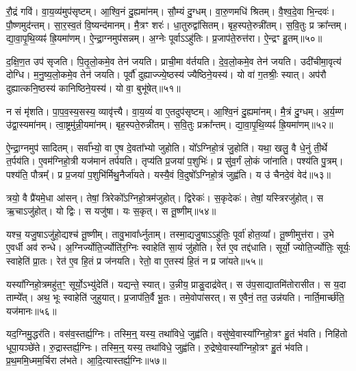 रौ॒द्रं गवि॑।
वा॒य॒व्य॑मुप॑सृष्टम्।
आ॒श्वि॒नं दु॒ह्यमा॑नम्।
सौ॒म्यं दु॒ग्धम्।
वा॒रु॒णमधि॑ श्रितम्।
वै॒श्व॒दे॒वा भि॒न्दवः॑।
पौ॒ष्णमुद॑न्तम्।
सा॒र॒स्व॒तं वि॒ष्यन्द॑मानम्।
मै॒त्रꣳ शरः॑।
धा॒तुरुद्वा॑सितम्।
बृह॒स्पते॒रुन्नी॑तम्।
स॒वि॒तुः प्र क्रा᳚न्तम्।
द्या॒वा॒पृ॒थि॒व्यꣴ॑ ह्रि॒यमा॑णम्।
ऐ॒न्द्रा॒ग्नमुप॑सन्नम्।
अ॒ग्नेः पूर्वा\-ऽऽहु॑तिः।
प्र॒जा\-प॑ते॒रुत्त॑रा।
ऐ॒न्द्रꣳ हु॒तम्॥५०॥\anuvakamend[उद्वा॑सितꣳ स॒प्त च॑]

द॒क्षि॒ण॒त उप॑ \-सृजति।
पि॒तृ॒लो॒कमे॒व तेन॑ जयति।
प्राची॒मा व॑र्तयति।
दे॒व॒लो॒कमे॒व तेन॑ जयति।
उदी॑चीमा॒वृत्य॑ दोग्धि।
म॒नु॒ष्य॒लो॒कमे॒व तेन॑ जयति।
पूर्वौ॑ दुह्याज्ज्ये॒ष्ठस्य॑ ज्यैष्ठिने॒यस्य॑।
यो वा॑ ग॒तश्रीः॒ स्यात्।
अप॑रौ दुह्यात्कनि॒ष्ठस्य॑ कानिष्ठिने॒यस्य॑।
यो वा॒ बुभू॑षेत्॥५१॥

न सं मृ॑शति।
पा॒प॒व॒स्य॒सस्य॒ व्यावृ॑त्त्यै।
वा॒य॒व्यं॑ वा ए॒तदुप॑सृष्टम्।
आ॒श्वि॒नं दु॒ह्यमा॑नम्।
मै॒त्रं दु॒ग्धम्।
अ॒र्य॒म्ण उ॑द्वा॒स्यमा॑नम्।
त्वा॒ष्ट्रमु॑न्नी॒यमा॑नम्।
बृह॒स्पते॒रुन्नी॑तम्।
स॒वि॒तुः प्रक्रा᳚न्तम्।
द्या॒वा॒पृ॒थि॒व्यꣴ॑ ह्रि॒यमा॑णम्॥५२॥

ऐ॒न्द्रा॒ग्नमुप॑ सादितम्।
सर्वा᳚भ्यो॒ वा ए॒ष दे॒वता᳚भ्यो जुहोति।
यो᳚ऽग्निहो॒त्रं जु॒होति॑।
यथा॒ खलु॒ वै धे॒नुं ती॒र्थे त॒र्पय॑ति।
ए॒वम॑ग्निहो॒त्री यज॑मानं तर्पयति।
तृप्य॑ति प्र॒जया॑ प॒शुभिः॑।
प्र सु॑व॒र्गं लो॒कं जा॑नाति।
पश्य॑ति पु॒त्रम्।
पश्य॑ति॒ पौत्रम्᳚।
प्र प्र॒जया॑ प॒शुभि॑र्मिथु॒नैर्जा॑यते।
यस्यै॒वं वि॒दुषो᳚\-ऽग्निहो॒त्रं जुह्व॑ति।
य उ॑ चैनदे॒वं वेद॑॥५३॥\anuvakamend[बुभू॑षेद्ध्रि॒यमा॑णञ्जायते॒ द्वे च॑]

त्रयो॒ वै प्रै॑यमे॒धा आ॑सन्।
तेषां॒ त्रिरेको᳚\-ऽग्निहो॒त्रम॑जुहोत्।
द्विरेकः॑।
स॒कृदेकः॑।
तेषां॒ यस्त्रिरजु॑होत्।
स ऋ॒चा\-ऽजु॑होत्।
यो द्विः।
स यजु॑षा।
यः स॒कृत्।
स तू॒ष्णीम्॥५४॥

यश्च॒ यजु॒षा\-ऽजु॑हो॒द्यश्च॑ तू॒ष्णीम्।
तावु॒भावा᳚र्ध्नुताम्।
तस्मा॒द्यजु॒षा\-ऽऽहु॑तिः॒ पूर्वा॑ होत॒व्या᳚।
तू॒ष्णीमुत्त॑रा।
उ॒भे ए॒वर्धी अव॑ रुन्धे।
अ॒ग्निर्ज्योति॒र्ज्योति॑र॒ग्निः स्वाहेति॑ सा॒यं जु॑होति।
रेत॑ ए॒व तद्द॑धाति।
सूर्यो॒ ज्योति॒र्ज्योतिः॒ सूर्यः॒ स्वाहेति॑ प्रा॒तः।
रेत॑ ए॒व हि॒तं प्र ज॑नयति।
रेतो॒ वा ए॒तस्य॑ हि॒तं न प्र जा॑यते॥५५॥

यस्या᳚ग्निहो॒त्रमहु॑त॒ꣳ॒ सूर्यो॒\-ऽभ्यु॑देति॑।
यद्यन्ते॒ स्यात्।
उ॒न्नीय॒ प्राङु॒दाद्र॑वेत्।
स उ॑प॒साद्यातमि॑तोरासीत।
स य॒दा ताम्ये᳚त्।
अथ॒ भूः स्वाहेति॑ जुहुयात्।
प्र॒जा\-प॑ति॒र्वै भू॒तः।
तमे॒वोपा॑सरत्।
स ए॒वैनं॒ तत॒ उन्न॑यति।
नार्ति॒मार्च्छ॑ति॒ यज॑मानः॥५६॥\anuvakamend[तू॒ष्णीं जा॑यते॒ यज॑मानः]

यद॒ग्निमु॒द्धर॑ति।
वस॑व॒स्तर्ह्य॒ग्निः।
तस्मि॒न्॒ यस्य॒ तथा॑विधे॒ जुह्व॑ति।
वसु॑ष्वे॒वास्या᳚ग्निहो॒त्रꣳ हु॒तं भ॑वति।
निहि॑तो धूपा॒यञ्छे॑ते।
रु॒द्रास्तर्ह्य॒ग्निः।
तस्मि॒न्॒ यस्य॒ तथा॑विधे॒ जुह्व॑ति।
रु॒द्रेष्वे॒वास्या᳚ग्निहो॒त्रꣳ हु॒तं भ॑वति।
प्र॒थ॒ममि॒ध्मम॒र्चिरा ल॑भते।
आ॒दि॒त्यास्तर्ह्य॒ग्निः॥५७॥

